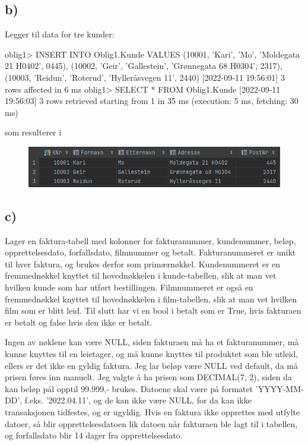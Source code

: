 \documentclass[%
notitlepage,
 amsmath,amssymb,
 aps,
rmp,
]{revtex4-2}  %
\begin{document}
\subsection*{b)}
Legger til data for tre kunder:
\begin{sql}
oblig1> INSERT INTO Oblig1.Kunde
        VALUES (10001, 'Kari', 'Mo', 'Moldegata 21 H0402', 0445),
               (10002, 'Geir', 'Gallestein', 'Grønnegata 68 H0304', 2317),
               (10003, 'Reidun', 'Roterud', 'Hylleråsvegen 11', 2440)
[2022-09-11 19:56:01] 3 rows affected in 6 ms
oblig1> SELECT *
        FROM Oblig1.Kunde
[2022-09-11 19:56:03] 3 rows retrieved starting from 1 in 35 ms (execution: 5 ms, fetching: 30 ms)
\end{sql}
som resulterer i
\begin{figure}[H]
\centering\includegraphics[width=\columnwidth]{op2b.png}
\end{figure}

\subsection*{c)}
Lager en faktura-tabell med kolonner for fakturanummer, kundenummer, beløp, opprettelsesdato, forfallsdato, filmnummer og betalt. Fakturanummeret er unikt til hver faktura, og brukes derfor som primærnøkkel. Kundenummeret er en fremmednøkkel knyttet til hovednøkkelen i kunde-tabellen, slik at man vet hvilken kunde som har utført bestillingen. Filmnummeret er også en fremmednøkkel knyttet til hovednøkkelen i film-tabellen, slik at man vet hvilken film som er blitt leid. Til slutt har vi en bool i betalt som er True, hvis fakturaen er betalt og false hvis den ikke er betalt.

Ingen av nøklene kan være NULL, siden fakturaen må ha et fakturanummer, må kunne knyttes til en leietager, og må kunne knyttes til produktet som ble utleid, ellers er det ikke en gyldig faktura. Jeg lar beløp være NULL ved default, da må prisen føres inn manuelt. Jeg valgte å ha prisen som DECIMAL(7, 2), siden da kan beløp pål opptil 99.999,- brukes. Datoene skal være på formatet 'YYYY-MM-DD', f.eks. '2022.04.11', og de kan ikke være NULL, for da kan ikke transaksjonen tidfestes, og er ugyldig. Hvis en faktura ikke opprettes med utfylte datoer, så blir opprettelsesdatoen lik datoen når fakturaen ble lagt til i tabellen, og forfallsdato blir 14 dager fra opprettelsesdato.
\end{document}
